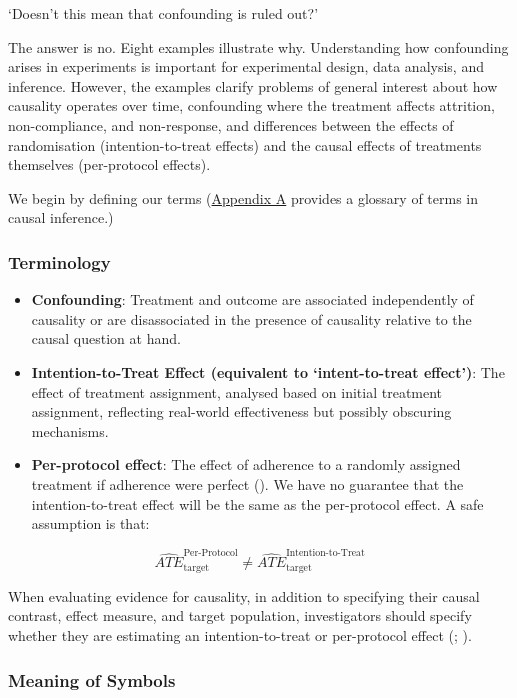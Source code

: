 \documentclass[
  single column]{article}
\begin{document}
`Doesn't this mean that confounding is ruled out?'

The answer is no. Eight examples illustrate why. Understanding how
confounding arises in experiments is important for experimental design,
data analysis, and inference. However, the examples clarify problems of
general interest about how causality operates over time, confounding
where the treatment affects attrition, non-compliance, and non-response,
and differences between the effects of randomisation (intention-to-treat
effects) and the causal effects of treatments themselves (per-protocol
effects).

We begin by defining our terms (\hyperref[id-app-a]{Appendix A} provides
a glossary of terms in causal inference.)

\subsubsection{Terminology}\label{terminology}

\begin{itemize}
\item
  \textbf{Confounding}: Treatment and outcome are associated
  independently of causality or are disassociated in the presence of
  causality relative to the causal question at hand.
\item
  \textbf{Intention-to-Treat Effect (equivalent to `intent-to-treat
  effect')}: The effect of treatment assignment, analysed based on
  initial treatment assignment, reflecting real-world effectiveness but
  possibly obscuring mechanisms.
\item
  \textbf{Per-protocol effect}: The effect of adherence to a randomly
  assigned treatment if adherence were perfect
  (). We have no
  guarantee that the intention-to-treat effect will be the same as the
  per-protocol effect. A safe assumption is that:
\end{itemize}

\[
\widehat{ATE}_{\text{target}}^{\text{Per-Protocol}} \ne \widehat{ATE}_{\text{target}}^{\text{Intention-to-Treat}}
\]

When evaluating evidence for causality, in addition to specifying their
causal contrast, effect measure, and target population, investigators
should specify whether they are estimating an intention-to-treat or
per-protocol effect (;
).

\subsubsection{Meaning of Symbols}\label{meaning-of-symbols}
\end{document}
